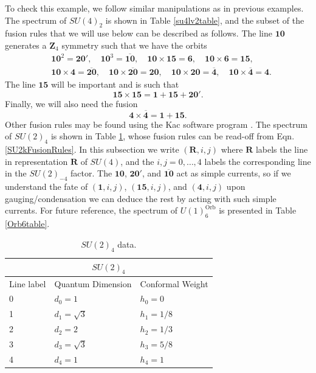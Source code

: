 \documentclass[11pt]{article}
\numberwithin{equation}{section}
\begin{document}
To check this example, we follow similar manipulations as in previous examples. The spectrum of $SU(4)_{2}$ is shown in Table \ref{su4lv2table}, and the subset of the fusion rules that we will use below can be described as follows. The line $\mathbf{10}$ generates a $\mathbf{Z}_{4}$ symmetry such that we have the orbits
\begin{align}
    &\mathbf{10}^{2} = \mathbf{20}', \quad \mathbf{10}^{3} = \overline{\mathbf{10}}, \quad \mathbf{10} \times \mathbf{15} = \mathbf{6}, \quad \mathbf{10} \times \mathbf{6} = \mathbf{15}, \\
    &\mathbf{10} \times \mathbf{4} = \overline{\mathbf{20}},  \quad \mathbf{10} \times \overline{\mathbf{20}} = \mathbf{20}, \quad \mathbf{10} \times \mathbf{20} = \overline{\mathbf{4}}, \quad \mathbf{10} \times \overline{\mathbf{4}} = \mathbf{4}.
\end{align}
The line $\mathbf{15}$ will be important and is such that
\begin{equation}
    \mathbf{15} \times \mathbf{15} = \mathbf{1} + \mathbf{15} + \mathbf{20}'.
\end{equation}
Finally, we will also need the fusion
\begin{equation}
    \mathbf{4} \times \overline{\mathbf{4}} = \mathbf{1} + \mathbf{15}.
\end{equation}
Other fusion rules may be found using the Kac software program \cite{Kac}. The spectrum of $SU(2)_{4}$ is shown in Table \ref{su2lv4table}, whose fusion rules can be read-off from Eqn. \eqref{SU2kFusionRules}. In this subsection we write $(\mathbf{R},i,j)$ where $\mathbf{R}$ labels the line in representation $\mathbf{R}$ of $SU(4)$, and the $i,j = 0, \ldots, 4$ labels the corresponding line in the $SU(2)_{-4}$ factor. The $\mathbf{10}$, $\mathbf{20'}$, and $\overline{\mathbf{10}}$ act as simple currents, so if we understand the fate of $(\mathbf{1},i,j)$, $(\mathbf{15},i,j)$, and $(\mathbf{4},i,j)$ upon gauging/condensation we can deduce the rest by acting with such simple currents. For future reference, the spectrum of $U(1)^{\mathrm{Orb}}_{6}$ is presented in Table \ref{Orb6table}.

\begin{table}[!b]
\centering
\begin{tabular}[h]{|p{4cm}|p{4cm}|p{4cm}| }
\hline 
\multicolumn{3}{|c|}{$SU(2)_{4}$} \\
\hline
Line label & Quantum Dimension & Conformal Weight \\
\hline
0 & $d_{0} = 1$ & $h_{0}=0$ \\
1 & $d_{1} = \sqrt{3}$ & $h_{1}=1/8$ \\
2 & $d_{2} = 2$ & $h_{2}=1/3$ \\
3 & $d_{3} = \sqrt{3}$ & $h_{3}=5/8$ \\
4 & $d_{4} = 1$ & $h_{4}=1$ \\
\hline
\end{tabular}
\caption{$SU(2)_{4}$ data.}  \label{su2lv4table}
\end{table}
\end{document}
